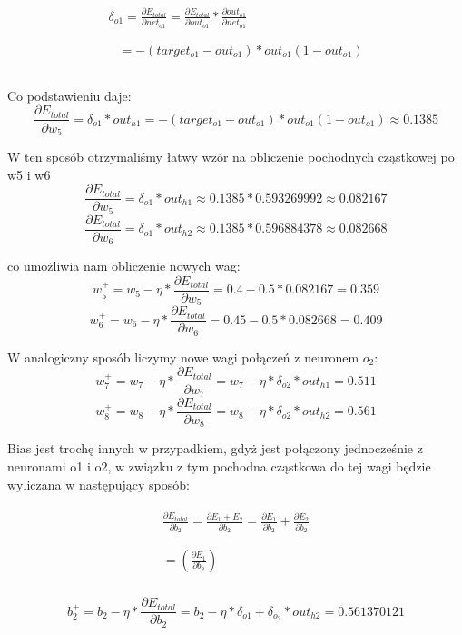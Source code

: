 \begin{gather}
  \begin{aligned}
    \delta_{o1} = \frac{\partial E_{total}}{\partial net_{o1}} = \frac{\partial E_{total}}{\partial out_{o1}} * \frac{\partial out_{o1}}{\partial net_{o1}}
  \end{aligned}\\
  \begin{aligned}\\
    &= -(target_{o1} - out_{o1}) * out_{o1}(1 - out_{o1}) \\
  \end{aligned}\\
\end{gather}

Co podstawieniu daje:
\[
  \frac{\partial E_{total}}{\partial w_{5}} = \delta_{o1}  * out_{h1} = -(target_{o1} - out_{o1}) * out_{o1}(1 - out_{o1}) \approx 0.1385
\]

W ten sposób otrzymaliśmy łatwy wzór na obliczenie pochodnych cząstkowej po w5 i w6
\[
  \frac{\partial E_{total}}{\partial w_{5}} = \delta_{o1}  * out_{h1} \approx  0.1385 * 0.593269992 \approx 0.082167
\]
\[
  \frac{\partial E_{total}}{\partial w_{6}} = \delta_{o1}  * out_{h2} \approx  0.1385 * 0.596884378 \approx 0.082668
\]

co umożliwia nam obliczenie nowych wag:
\[
  w_5^{+} = w_5 - \eta * \frac{\partial E_{total}}{\partial w_{5}} = 0.4 - 0.5 * 0.082167 = 0.359
\]
\[
  w_6^{+} = w_6 - \eta * \frac{\partial E_{total}}{\partial w_{6}} = 0.45 - 0.5 * 0.082668 = 0.409
\]

W analogiczny sposób liczymy nowe wagi połączeń z neuronem \(o_2\):
\[
  w_7^{+} = w_7 - \eta * \frac{\partial E_{total}}{\partial w_{7}} = w_7 - \eta * \delta_{o2}  * out_{h1} = 0.511
\]
\[
  w_8^{+} = w_8 - \eta * \frac{\partial E_{total}}{\partial w_{8}} = w_8 - \eta * \delta_{o2}  * out_{h2} = 0.561
\]

Bias jest trochę innych w przypadkiem, gdyż jest połączony jednocześnie z neuronami o1 i o2, w związku z tym pochodna cząstkowa do tej wagi będzie wyliczana w następujący sposób:

\begin{gather}
  \begin{aligned}
    \frac{\partial E_{total}}{\partial b_2} = \frac{\partial E_1+E_2}{\partial b_2}=\frac{\partial E_1}{\partial b_2}+\frac{\partial E_2}{\partial b_2}
  \end{aligned}\\
  \begin{aligned}\\
    = (\frac{\partial E_1}{\partial b_2})
  \end{aligned}\\
\end{gather}


\[
  b_2^{+} = b_2 - \eta * \frac{\partial E_{total}}{\partial b_2} = b_2 - \eta * \delta_{o1}+\delta_{o_2}  * out_{h2} = 0.561370121
\]














